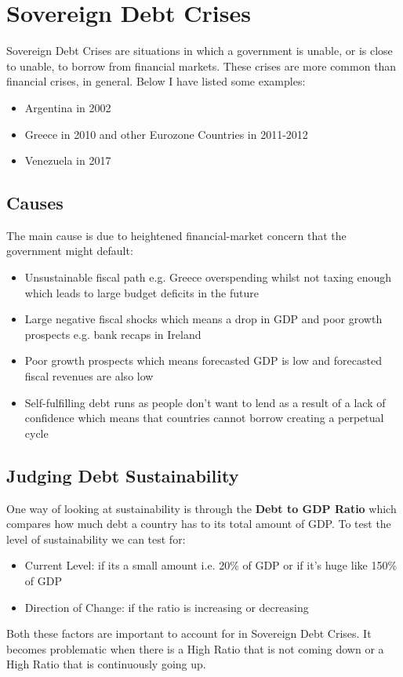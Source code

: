 \documentclass[12pt, letterpaper]{article}
\begin{document}
\newpage
\section{Sovereign Debt Crises}
Sovereign Debt Crises are situations in which a government is unable, or is close to unable, to borrow from financial markets. These crises are more common than financial crises, in general. Below I have listed some examples:
\begin{itemize}
	\item Argentina in 2002
	\item Greece in 2010 and other Eurozone Countries in 2011-2012
	\item Venezuela in 2017
\end{itemize}

\subsection{Causes}
The main cause is due to heightened financial-market concern that the government might default:
\begin{itemize}
	\item Unsustainable fiscal path e.g. Greece overspending whilst not taxing enough which leads to large budget deficits in the future
	\item Large negative fiscal shocks which means a drop in GDP and poor growth prospects e.g. bank recaps in Ireland
	\item Poor growth prospects which means forecasted GDP is low and forecasted fiscal revenues are also low
	\item Self-fulfilling debt runs as people don't want to lend as a result of a lack of confidence which means that countries cannot borrow creating a perpetual cycle
\end{itemize}

\subsection{Judging Debt Sustainability}
One way of looking at sustainability is through the \textbf{Debt to GDP Ratio} which compares how much debt a country has to its total amount of GDP. To test the level of sustainability we can test for:
\begin{itemize}
	\item Current Level: if its a small amount i.e. 20\% of GDP or if it's huge like 150\% of GDP
	\item Direction of Change: if the ratio is increasing or decreasing
\end{itemize}
Both these factors are important to account for in Sovereign Debt Crises. It becomes problematic when there is a High Ratio that is not coming down or a High Ratio that is continuously going up.
\end{document}
